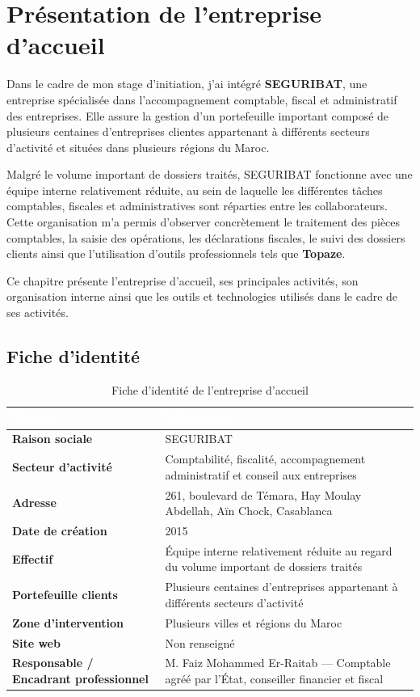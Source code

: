 \documentclass[12pt,a4paper,oneside]{report}
\newcommand{\TableSetup}{%
  \arrayrulecolor{ComptaTableLine}%
  \setlength{\arrayrulewidth}{0.45pt}%
  \renewcommand{\arraystretch}{1.18}%
}
\newcommand{\TableHead}[1]{\textcolor{white}{\textbf{#1}}}
\begin{document}
\chapter{Présentation de l'entreprise d'accueil}

Dans le cadre de mon stage d'initiation, j'ai intégré \textbf{SEGURIBAT}, une entreprise spécialisée dans l'accompagnement comptable, fiscal et administratif des entreprises. Elle assure la gestion d'un portefeuille important composé de plusieurs centaines d'entreprises clientes appartenant à différents secteurs d'activité et situées dans plusieurs régions du Maroc.

Malgré le volume important de dossiers traités, SEGURIBAT fonctionne avec une équipe interne relativement réduite, au sein de laquelle les différentes tâches comptables, fiscales et administratives sont réparties entre les collaborateurs. Cette organisation m'a permis d'observer concrètement le traitement des pièces comptables, la saisie des opérations, les déclarations fiscales, le suivi des dossiers clients ainsi que l'utilisation d'outils professionnels tels que \textbf{Topaze}.

Ce chapitre présente l'entreprise d'accueil, ses principales activités, son organisation interne ainsi que les outils et technologies utilisés dans le cadre de ses activités.

\section{Fiche d'identité}
\begin{table}[H]
\centering
\caption{Fiche d'identité de l'entreprise d'accueil}
\TableSetup
\begin{tabularx}{\textwidth}{|L{5cm}|Y|}
\toprule
{}\TableHead{Élément} & \TableHead{Information} \\
\midrule
\textbf{Raison sociale} & SEGURIBAT \\
\textbf{Secteur d'activité} & Comptabilité, fiscalité, accompagnement administratif et conseil aux entreprises \\
\textbf{Adresse} & 261, boulevard de Témara, Hay Moulay Abdellah, Aïn Chock, Casablanca \\
\textbf{Date de création} & 2015 \\
\textbf{Effectif} & Équipe interne relativement réduite au regard du volume important de dossiers traités \\
\textbf{Portefeuille clients} & Plusieurs centaines d'entreprises appartenant à différents secteurs d'activité \\
\textbf{Zone d'intervention} & Plusieurs villes et régions du Maroc \\
\textbf{Site web} & Non renseigné \\
\textbf{Responsable / Encadrant professionnel} & M. Faiz Mohammed Er-Raitab --- Comptable agréé par l'État, conseiller financier et fiscal \\
\bottomrule
\end{tabularx}
\end{table}
\end{document}
